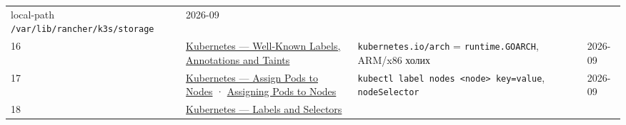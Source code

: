 \begin{longtable}[]{@{}llll@{}}
\begin{minipage}[t]{0.22\columnwidth}
local-path \texttt{/\allowbreak{}var/\allowbreak{}lib/\allowbreak{}rancher/\allowbreak{}k3s/\allowbreak{}storage}\strut
\end{minipage} & \begin{minipage}[t]{0.22\columnwidth}\raggedright
2026-09\strut
\end{minipage}\tabularnewline
\begin{minipage}[t]{0.22\columnwidth}\raggedright
16\strut
\end{minipage} & \begin{minipage}[t]{0.22\columnwidth}\raggedright
\href{https://kubernetes.io/docs/reference/labels-annotations-taints/}{Kubernetes --- Well-Known Labels, Annotations and Taints}\strut
\end{minipage} & \begin{minipage}[t]{0.22\columnwidth}\raggedright
\texttt{kubernetes.\allowbreak{}io/\allowbreak{}arch} = \texttt{runtime.GOARCH}, ARM/x86 холих\strut
\end{minipage} & \begin{minipage}[t]{0.22\columnwidth}\raggedright
2026-09\strut
\end{minipage}\tabularnewline
\begin{minipage}[t]{0.22\columnwidth}\raggedright
17\strut
\end{minipage} & \begin{minipage}[t]{0.22\columnwidth}\raggedright
\href{https://kubernetes.io/docs/tasks/configure-pod-container/assign-pods-nodes/}{Kubernetes --- Assign Pods to Nodes} · \href{https://kubernetes.io/docs/concepts/scheduling-eviction/assign-pod-node/}{Assigning Pods to Nodes}\strut
\end{minipage} & \begin{minipage}[t]{0.22\columnwidth}\raggedright
\texttt{kubectl\ label\ nodes\ \textless{}node\textgreater{}\ key=\allowbreak{}value}, \texttt{nodeSelector}\strut
\end{minipage} & \begin{minipage}[t]{0.22\columnwidth}\raggedright
2026-09\strut
\end{minipage}\tabularnewline
\begin{minipage}[t]{0.22\columnwidth}\raggedright
18\strut
\end{minipage} & \begin{minipage}[t]{0.22\columnwidth}\raggedright
\href{https://kubernetes.io/docs/concepts/overview/working-with-objects/labels/}{Kubernetes --- Labels and Selectors}\strut
\end{minipage} & \begin{minipage}[t]{0.22\columnwidth}\raggedright

\end{minipage}
\end{longtable}
